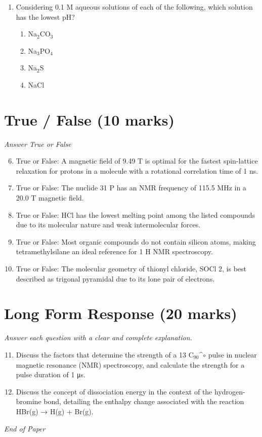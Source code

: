 \documentclass[12pt]{article}
\begin{document}
\begin{enumerate}[label=\arabic*.]
\begin{enumerate}[label=(\alph*)]
    \item I only
    \item II only
    \item III only
    \item I and III only
\end{enumerate}
\item Considering 0.1 M aqueous solutions of each of the following, which solution has the lowest pH?
\begin{enumerate}[label=(\alph*)]
    \item Na$_{2}$CO$_{3}$
    \item Na$_{3}$PO$_{4}$
    \item Na$_{2}$S
    \item NaCl
\end{enumerate}
\end{enumerate}

\section*{True / False (10 marks)}
\textit{Answer True or False}
\begin{enumerate}[label=\arabic*.]
\setcounter{enumi}{5}
\item True or False: A magnetic field of 9.49 T is optimal for the fastest spin-lattice relaxation for protons in a molecule with a rotational correlation time of 1 ns.
\item True or False: The nuclide 31 P has an NMR frequency of 115.5 MHz in a 20.0 T magnetic field.
\item True or False: HCl has the lowest melting point among the listed compounds due to its molecular nature and weak intermolecular forces.
\item True or False: Most organic compounds do not contain silicon atoms, making tetramethylsilane an ideal reference for 1 H NMR spectroscopy.
\item True or False: The molecular geometry of thionyl chloride, SOCl 2, is best described as trigonal pyramidal due to its lone pair of electrons.
\end{enumerate}

\section*{Long Form Response (20 marks)}
\textit{Answer each question with a clear and complete explanation.}
\begin{enumerate}[label=\arabic*.]
\setcounter{enumi}{10}
\item Discuss the factors that determine the strength of a 13 C$_{90}$^\ensuremath{\circ} pulse in nuclear magnetic resonance (NMR) spectroscopy, and calculate the strength for a pulse duration of 1 μs.
\item Discuss the concept of dissociation energy in the context of the hydrogen-bromine bond, detailing the enthalpy change associated with the reaction HBr(g) → H(g) + Br(g).
\end{enumerate}

\vfill
\noindent\textit{End of Paper}
\end{document}
